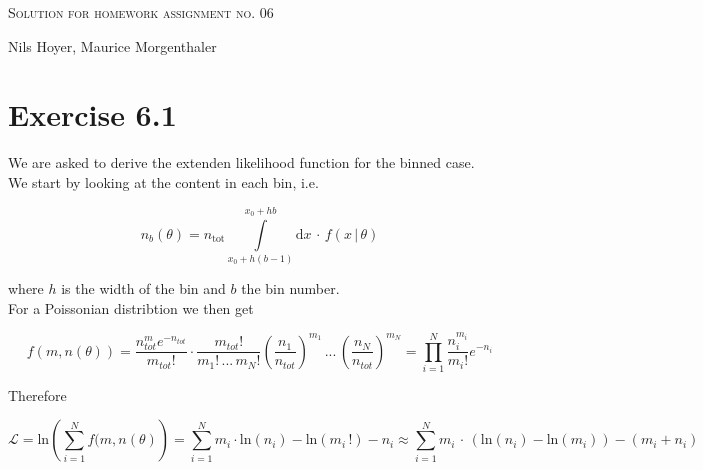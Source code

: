 \documentclass[10pt]{article}
\newenvironment{myfont}{\fontfamily{put}\selectfont}{\par}
\begin{document}
\begin{myfont}

\begin{center}
  \begin{Large}
    \textsc{Solution for homework assignment no. 06} \\
  \end{Large}
	\vspace*{0.4cm}
    Nils Hoyer, Maurice Morgenthaler
  \vspace*{1cm}
\end{center}

\section*{Exercise 6.1}

We are asked to derive the extenden likelihood function for the binned case. \\

\noindent We start by looking at the content in each bin, i.e.

\begin{equation}
n_{b}(\theta) = n_{\textrm{tot}} \int\limits_{x_{0} + h(b-1)}^{x_{0} + hb} \textrm{d}x \,\cdot\, f(x \,|\, \theta)
\end{equation}

\noindent where $h$ is the width of the bin and $b$ the bin number. \\
For a Poissonian distribtion we then get

\begin{equation}
f(m, n(\theta)) = \frac{n_{tot}^{m}e^{-n_{tot}}}{m_{tot}!} \cdot \frac{m_{tot}!}{m_{1}!\,...\, m_{N}!} \left(\frac{n_{1}}{n_{tot}}\right)^{m_{1}} \,...\, \left(\frac{n_{N}}{n_{tot}}\right)^{m_{N}} = \prod_{i = 1}^{N}\frac{n_{i}^{m_{i}}}{m_{i}!}e^{-n_{i}}
\end{equation}

\noindent Therefore

\begin{equation}
\mathcal{L} = \textrm{ln}\left(\sum_{i = 1}^{N} f(m, n(\theta)\right) = \sum_{i = 1}^{N}m_{i}\cdot \textrm{ln} \left(n_{i}\right) - \textrm{ln}\left(m_{i}\,!\right) - n_{i} \approx \sum_{i = 1}^{N}m_{i} \,\cdot\, \left(\textrm{ln}(n_{i}) - \textrm{ln}(m_{i})\right) - (m_{i} + n_{i})
\end{equation}


\end{myfont}
\end{document}
